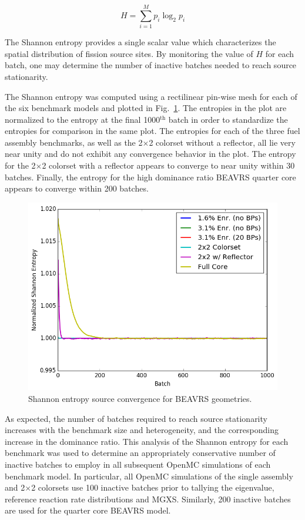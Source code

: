 \begin{equation}
\label{eqn:chap7-shannon-entropy}
H = \displaystyle\sum\limits_{i=1}^{M} p_{i} \log_{2} p_{i}
\end{equation}

\noindent The Shannon entropy provides a single scalar value which characterizes the spatial distribution of fission source sites. By monitoring the value of $H$ for each batch, one may determine the number of inactive batches needed to reach source stationarity.

The Shannon entropy was computed using a rectilinear pin-wise mesh for each of the six benchmark models and plotted in Fig.~\ref{fig:chap7-entropy}. The entropies in the plot are normalized to the entropy at the final 1000$^{\text{th}}$ batch in order to standardize the entropies for comparison in the same plot. The entropies for each of the three fuel assembly benchmarks, as well as the 2$\times$2 colorset without a reflector, all lie very near unity and do not exhibit any convergence behavior in the plot. The entropy for the 2$\times$2 colorset with a reflector appears to converge to near unity within 30 batches. Finally, the entropy for the high dominance ratio \ac{BEAVRS} quarter core appears to converge within 200 batches. 

\begin{figure}[h!]
  \centering
  \includegraphics[width=0.7\linewidth]{figures/benchmarks/entropy/entropy-all}
\caption[Shannon entropy source convergence for BEAVRS geometries]{Shannon entropy source convergence for BEAVRS geometries.}
\label{fig:chap7-entropy}
\end{figure}

As expected, the number of batches required to reach source stationarity increases with the benchmark size and heterogeneity, and the corresponding increase in the dominance ratio. This analysis of the Shannon entropy for each benchmark was used to determine an appropriately conservative number of inactive batches to employ in all subsequent OpenMC simulations of each benchmark model. In particular, all OpenMC simulations of the single assembly and 2$\times$2 colorsets use 100 inactive batches prior to tallying the eigenvalue, reference reaction rate distributions and \ac{MGXS}. Similarly, 200 inactive batches are used for the quarter core \ac{BEAVRS} model.

